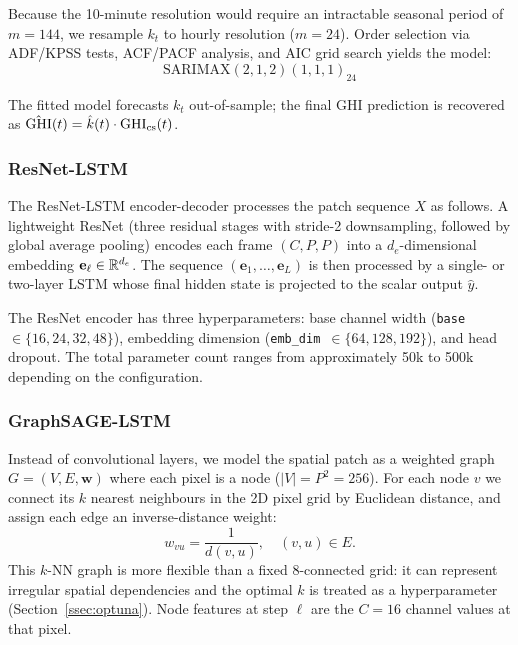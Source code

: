 Because the 10-minute resolution would require an intractable seasonal period of
$m = 144$, we resample $k_t$ to hourly resolution ($m = 24$). Order selection
via ADF/KPSS tests, ACF/PACF analysis, and AIC grid search \cite{hyndman2018}
yields the model:
\begin{equation}
  \text{SARIMAX}(2,1,2)(1,1,1)_{24}
  \label{eq:sarima}
\end{equation}

The fitted model forecasts $k_t$ out-of-sample; the final GHI prediction is
recovered as $\hat{\text{GHI}}(t) = \hat{k}(t)\cdot\text{GHI}_{\text{cs}}(t)$.

\subsubsection{ResNet-LSTM}
\label{ssec:resnet}

The ResNet-LSTM encoder-decoder processes the patch sequence $X$ as follows.
A lightweight ResNet \cite{he2016} (three residual stages with stride-2 downsampling,
followed by global average pooling) encodes each frame $(C, P, P)$ into a
$d_e$-dimensional embedding $\mathbf{e}_\ell \in \mathbb{R}^{d_e}$. The sequence
$(\mathbf{e}_1, \ldots, \mathbf{e}_L)$ is then processed by a single- or two-layer
LSTM \cite{hochreiter1997} whose final hidden state is projected to the scalar
output $\hat{y}$.

The ResNet encoder has three hyperparameters: base channel width
(\texttt{base}~$\in\{16, 24, 32, 48\}$), embedding dimension
(\texttt{emb\_dim}~$\in\{64, 128, 192\}$), and head dropout. The total parameter
count ranges from approximately 50k to 500k depending on the configuration.

\subsubsection{GraphSAGE-LSTM}
\label{ssec:gsage}

Instead of convolutional layers, we model the spatial patch as a weighted graph
$G = (V, E, \mathbf{w})$ where each pixel is a node ($|V| = P^2 = 256$).
For each node $v$ we connect its $k$ nearest neighbours in the 2D pixel grid
by Euclidean distance, and assign each edge an inverse-distance weight:
\begin{equation}
  w_{vu} = \frac{1}{d(v,u)}, \quad (v, u) \in E.
  \label{eq:edge_weight}
\end{equation}
This $k$-NN graph is more flexible than a fixed 8-connected grid: it can represent
irregular spatial dependencies and the optimal $k$ is treated as a hyperparameter
(Section~\ref{ssec:optuna}). Node features at step $\ell$ are the $C = 16$
channel values at that pixel.

